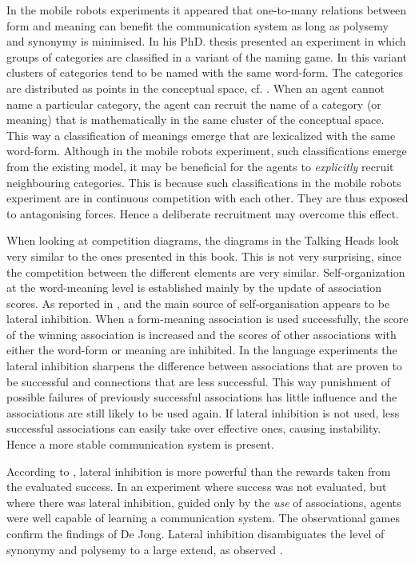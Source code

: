 In the mobile robots experiments it appeared that one-to-many relations between form and meaning can benefit the communication system as long as polysemy and synonymy is minimised. In his PhD. thesis \citet{kaplan:2000} presented an experiment in which groups of categories are classified in a variant of the naming game. In this variant clusters of categories tend to be named with the same word-form. The categories are distributed as points in the {\sc conceptual space}, cf. \citet{gardenfors:1996}. When an agent cannot name a particular category, the agent can recruit the name of a category (or meaning) that is mathematically in the same cluster of the conceptual space. This way a classification of meanings emerge that are lexicalized with the same word-form. Although in the mobile robots experiment, such classifications emerge from the existing model, it may be beneficial for the agents to {\em explicitly} recruit neighbouring categories. This is because such classifications in the mobile robots experiment are in continuous competition with each other. They are thus exposed to antagonising forces. Hence a deliberate recruitment may overcome this effect.



When looking at competition diagrams, the diagrams in the Talking Heads look very similar to the ones presented in this book. This is not very surprising, since the competition between the different elements are very similar. Self-organization at the word-meaning level is established mainly by the update of association scores. As reported in \citet{steels:2000}, \citet{dejong:2000} and \citet{kaplan:2000} the main source of self-organisation appears to be lateral inhibition. When a form-meaning association is used successfully, the score of the winning association is increased and the scores of other associations with either the word-form or meaning are inhibited. In the language experiments the lateral inhibition sharpens the difference between associations that are proven to be successful and connections that are less successful. This way punishment of possible failures of previously successful associations has little influence and the associations are still likely to be used again. If lateral inhibition is not used, less successful associations can easily take over effective ones, causing instability. Hence a more stable communication system is present.

According to \citet{dejong:2000}, lateral inhibition is more powerful than the rewards taken from the evaluated success. In an experiment where success was not evaluated, but where there was lateral inhibition, guided only by the {\em use} of associations, agents were well capable of learning a communication system. The observational games confirm the findings of De Jong. Lateral inhibition disambiguates the level of synonymy and polysemy to a large extend, as observed .

